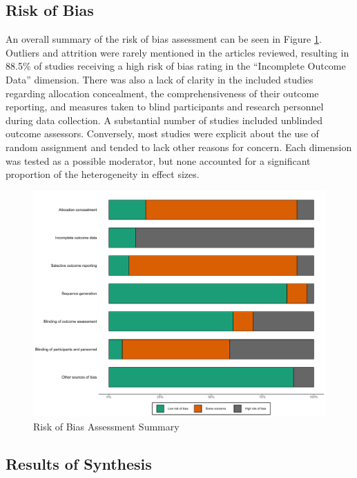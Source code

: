 \documentclass[
  english,
  man,mask,floatsintext]{apa7}
\begin{document}
\hypertarget{risk-of-bias}{%
\subsection{Risk of Bias}\label{risk-of-bias}}

An overall summary of the risk of bias assessment can be seen in Figure \ref{fig:fig2}. Outliers and attrition were rarely mentioned in the articles reviewed, resulting in 88.5\% of studies receiving a high risk of bias rating in the ``Incomplete Outcome Data'' dimension. There was also a lack of clarity in the included studies regarding allocation concealment, the comprehensiveness of their outcome reporting, and measures taken to blind participants and research personnel during data collection. A substantial number of studies included unblinded outcome assessors. Conversely, most studies were explicit about the use of random assignment and tended to lack other reasons for concern. Each dimension was tested as a possible moderator, but none accounted for a significant proportion of the heterogeneity in effect sizes.



\begin{figure}

{\centering \includegraphics[height=0.6\textheight]{../../figures/fig2} 

}

\caption{Risk of Bias Assessment Summary}\label{fig:fig2}
\end{figure}

\hypertarget{results-of-synthesis}{%
\subsection{Results of Synthesis}\label{results-of-synthesis}}
\end{document}
